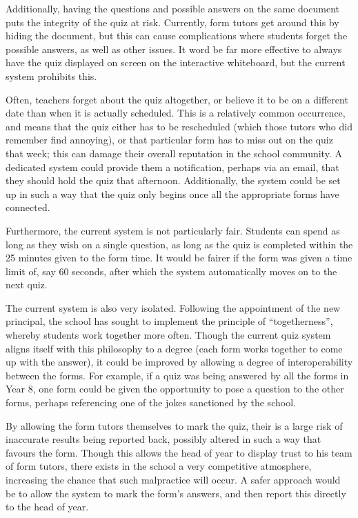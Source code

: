 Additionally, having the questions and possible answers on the same document puts the integrity of the quiz at risk. Currently, form tutors get around this by hiding the document, but this can cause complications where students forget the possible answers, as well as other issues. It word be far more effective to always have the quiz displayed on screen on the interactive whiteboard, but the current system prohibits this.

Often, teachers forget about the quiz altogether, or believe it to be on a different date than when it is actually scheduled. This is a relatively common occurrence, and means that the quiz either has to be rescheduled (which those tutors who did remember find annoying), or that particular form has to miss out on the quiz that week; this can damage their overall reputation in the school community. A dedicated system could provide them a notification, perhaps via an email, that they should hold the quiz that afternoon. Additionally, the system could be set up in such a way that the quiz only begins once all the appropriate forms have connected.

Furthermore, the current system is not particularly fair. Students can spend as long as they wish on a single question, as long as the quiz is completed within the 25 minutes given to the form time. It would be fairer if the form was given a time limit of, say 60 seconds, after which the system automatically moves on to the next quiz.

The current system is also very isolated. Following the appointment of the new principal, the school has sought to implement the principle of ``togetherness'', whereby students work together more often. Though the current quiz system aligns itself with this philosophy to a degree (each form works together to come up with the answer), it could be improved by allowing a degree of interoperability between the forms. For example, if a quiz was being answered by all the forms in Year 8, one form could be given the opportunity to pose a question to the other forms, perhaps referencing one of the jokes sanctioned by the school.

By allowing the form tutors themselves to mark the quiz, their is a large risk of
inaccurate results being reported back, possibly altered in such a way that favours the form. Though this allows the head of year to display trust to his team of form tutors, there exists in the school a very competitive atmosphere, increasing the chance that such malpractice will occur. A safer approach would be to allow the system to mark the form's answers, and then report this directly to the head of year.

